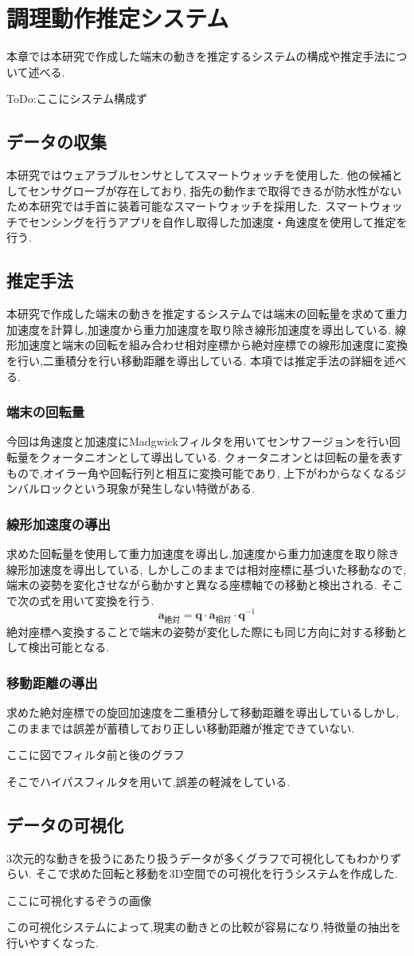 \section{調理動作推定システム}
本章では本研究で作成した端末の動きを推定するシステムの構成や推定手法について述べる.

ToDo:ここにシステム構成ず
\subsection{データの収集}
本研究ではウェアラブルセンサとしてスマートウォッチを使用した.
他の候補としてセンサグローブが存在しており,
指先の動作まで取得できるが防水性がないため本研究では手首に装着可能なスマートウォッチを採用した.
スマートウォッチでセンシングを行うアプリを自作し取得した加速度・角速度を使用して推定を行う.
\subsection{推定手法}
本研究で作成した端末の動きを推定するシステムでは端末の回転量を求めて重力加速度を計算し,加速度から重力加速度を取り除き線形加速度を導出している.
線形加速度と端末の回転を組み合わせ相対座標から絶対座標での線形加速度に変換を行い,二重積分を行い移動距離を導出している.
本項では推定手法の詳細を述べる.
\subsubsection{端末の回転量}
今回は角速度と加速度にMadgwickフィルタを用いてセンサフージョンを行い回転量をクォータニオンとして導出している.
クォータニオンとは回転の量を表すもので,オイラー角や回転行列と相互に変換可能であり,
上下がわからなくなるジンバルロックという現象が発生しない特徴がある.
\subsubsection{線形加速度の導出}
求めた回転量を使用して重力加速度を導出し,加速度から重力加速度を取り除き線形加速度を導出している,
しかしこのままでは相対座標に基づいた移動なので,端末の姿勢を変化させながら動かすと異なる座標軸での移動と検出される.
そこで次の式を用いて変換を行う.
\[
\mathbf{a}_{\text{絶対}} = \mathbf{q} \cdot \mathbf{a}_{\text{相対}} \cdot \mathbf{q}^{-1}
\]
絶対座標へ変換することで端末の姿勢が変化した際にも同じ方向に対する移動として検出可能となる.

\subsubsection{移動距離の導出}
求めた絶対座標での旋回加速度を二重積分して移動距離を導出しているしかし,
このままでは誤差が蓄積しており正しい移動距離が推定できていない.

ここに図でフィルタ前と後のグラフ

そこでハイパスフィルタを用いて,誤差の軽減をしている.

\subsection{データの可視化}
3次元的な動きを扱うにあたり扱うデータが多くグラフで可視化してもわかりずらい.
そこで求めた回転と移動を3D空間での可視化を行うシステムを作成した.

ここに可視化するぞうの画像

この可視化システムによって,現実の動きとの比較が容易になり,特徴量の抽出を行いやすくなった.